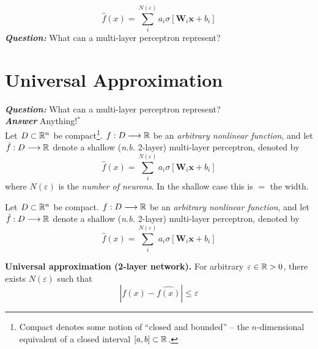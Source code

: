 \begin{frame}
    \[
        \hat{f}(x) =  \sum_i^{N(\varepsilon)} a_i \sigma \left[\mathbf{W}_i \mathbf{x} + b_i \right]
    \]
    \textbf{\textit{Question:}} What can a multi-layer perceptron represent? \\
\end{frame}

\section{Universal Approximation}

\begin{frame}
    \textbf{\textit{Question:}} What can a multi-layer perceptron represent? \\
    \textbf{\textit{Answer}} Anything!$^*$ \\
    \vspace{1cm}
    Let $D \subset \mathbb{R}^n$ be compact\footnote{\tiny
        Compact denotes some notion of ``closed and bounded'' -- the $n$-dimensional
        equivalent of a closed interval $[a, b] \subset \mathbb{R}$.
    }.
    $f: D \longrightarrow \mathbb{R}$ be an \textit{arbitrary nonlinear function}, and let $\hat{f}: D \longrightarrow
    \mathbb{R}$ denote a shallow (\textit{n.b.} 2-layer) multi-layer perceptron, denoted by
    \[
        \hat{f}(x) =  \sum_i^{N(\varepsilon)} a_i \sigma \left[\mathbf{W}_i \mathbf{x} + b_i \right]
    \]
    where $N(\varepsilon)$ is the \textit{number of neurons}. In the shallow case this is $=$ 
    the width.
\end{frame}
\begin{frame}
    Let $D \subset \mathbb{R}^n$ be compact.
    $f: D \longrightarrow \mathbb{R}$ be an \textit{arbitrary nonlinear function}, and let $\hat{f}: D \longrightarrow
    \mathbb{R}$ denote a shallow (\textit{n.b.} 2-layer) multi-layer perceptron, denoted by
    \[
        \hat{f}(x) =  \sum_i^{N(\varepsilon)} a_i \sigma \left[\mathbf{W}_i \mathbf{x} + b_i \right]
    \]
    \begin{theorem}
        \textbf{Universal approximation (2-layer network).} For arbitrary $\varepsilon \in \mathbb{R} > 0$, there
        exists $N(\varepsilon)$ such that 
        \[
        |f(x) - \hat{f(x)}| \leq \varepsilon
        \]
    \end{theorem}
\end{frame}

